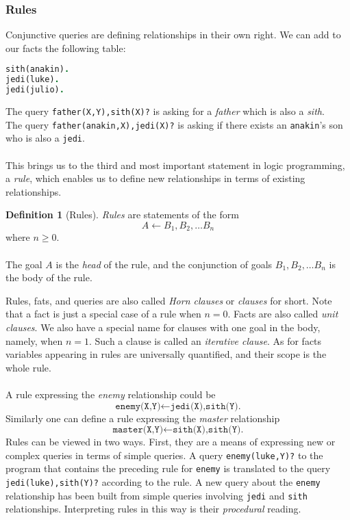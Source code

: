 \documentclass{report}
\theoremstyle{definition}
\theoremstyle{definition}
\newtheorem*{definition*}{Definition}
\newcommand{\ttt}[1]{\texttt{#1}}
\begin{document}
\subsubsection{Rules}
Conjunctive queries are defining relationships in their own right. We can add to our facts the following table:
\begin{lstlisting}[language=Prolog, caption=Force-Side Relationship]
sith(anakin).
jedi(luke).
jedi(julio).
\end{lstlisting}
The query \ttt{father(X,Y),sith(X)?} is asking for a \textit{father} which is also a \textit{sith}.\\
The query \ttt{father(anakin,X),jedi(X)?} is asking if there exists an \ttt{anakin}'s son who is also a \ttt{jedi}.\\\\
This brings us to the third and most important statement in logic programming, a \textit{rule}, which enables us to define new relationships in terms of existing relationships.
\pagebreak
\begin{definition*}[Rules]
	\textit{Rules} are statements of the form $$A \leftarrow B_1, B_2, \ldots B_n$$ where $n \geq 0$.\\\\
	The goal $A$ is the \textit{head} of the rule, and the conjunction of goals $B_1, B_2, \ldots B_n$ is the body of the rule.
\end{definition*}
Rules, fats, and queries are also called \textit{Horn clauses} or \textit{clauses} for short. Note that a fact is just a special case of a rule when $n = 0$. Facts are also called \textit{unit clauses}. We also have a special name for clauses with one goal in the body, namely, when $n = 1$. Such a clause is called an \textit{iterative clause}. As for facts variables appearing in rules are universally quantified, and their scope is the whole rule.\\\\
A rule expressing the \textit{enemy} relationship could be
\begin{equation*}
	\ttt{enemy(X,Y)} \leftarrow \ttt{jedi(X),sith(Y).}
\end{equation*}
Similarly one can define a rule expressing the \textit{master} relationship
\begin{equation*}
	\ttt{master(X,Y)} \leftarrow \ttt{sith(X),sith(Y).}
\end{equation*}
Rules can be viewed in two ways. First, they are a means of expressing new or complex queries in terms of simple queries. A query \ttt{enemy(luke,Y)?} to the program that contains the preceding rule for \ttt{enemy} is translated to the query \ttt{jedi(luke),sith(Y)?} according to the rule. A new query about the \ttt{enemy} relationship has been built from simple queries involving \ttt{jedi} and \ttt{sith} relationships. Interpreting rules in this way is their \textit{procedural} reading.\\\\
\end{document}
